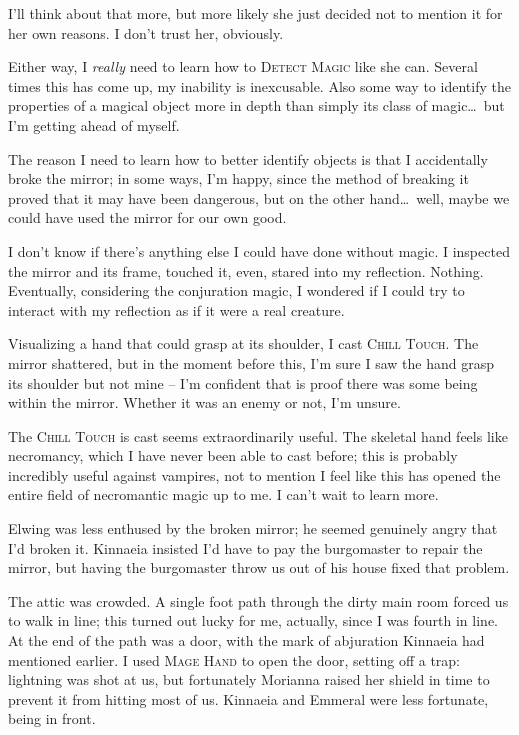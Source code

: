 I'll think about that more, but more likely she just decided not to mention it for her own reasons. I don't trust her, obviously.

Either way, I \emph{really} need to learn how to \textsc{Detect Magic} like she can. Several times this has come up, my inability is inexcusable. Also some way to identify the properties of a magical object more in depth than simply its class of magic\dots\ but I'm getting ahead of myself.

The reason I need to learn how to better identify objects is that I accidentally broke the mirror; in some ways, I'm happy, since the method of breaking it proved that it may have been dangerous, but on the other hand\dots\ well, maybe we could have used the mirror for our own good.

I don't know if there's anything else I could have done without magic. I inspected the mirror and its frame, touched it, even, stared into my reflection. Nothing. Eventually, considering the conjuration magic, I wondered if I could try to interact with my reflection as if it were a real creature.

Visualizing a hand that could grasp at its shoulder, I cast \textsc{Chill Touch}. The mirror shattered, but in the moment before this, I'm sure I saw the hand grasp its shoulder but not mine -- I'm confident that is proof there was some being within the mirror. Whether it was an enemy or not, I'm unsure.

The \textsc{Chill Touch} is cast seems extraordinarily useful. The skeletal hand feels like necromancy, which I have never been able to cast before; this is probably incredibly useful against vampires, not to mention I feel like this has opened the entire field of necromantic magic up to me. I can't wait to learn more.

Elwing was less enthused by the broken mirror; he seemed genuinely angry that I'd broken it. Kinnaeia insisted I'd have to pay the burgomaster to repair the mirror, but having the burgomaster throw us out of his house fixed that problem.

The attic was crowded. A single foot path through the dirty main room forced us to walk in line; this turned out lucky for me, actually, since I was fourth in line. At the end of the path was a door, with the mark of abjuration Kinnaeia had mentioned earlier. I used \textsc{Mage Hand} to open the door, setting off a trap: lightning was shot at us, but fortunately Morianna raised her shield in time to prevent it from hitting most of us. Kinnaeia and Emmeral were less fortunate, being in front.

